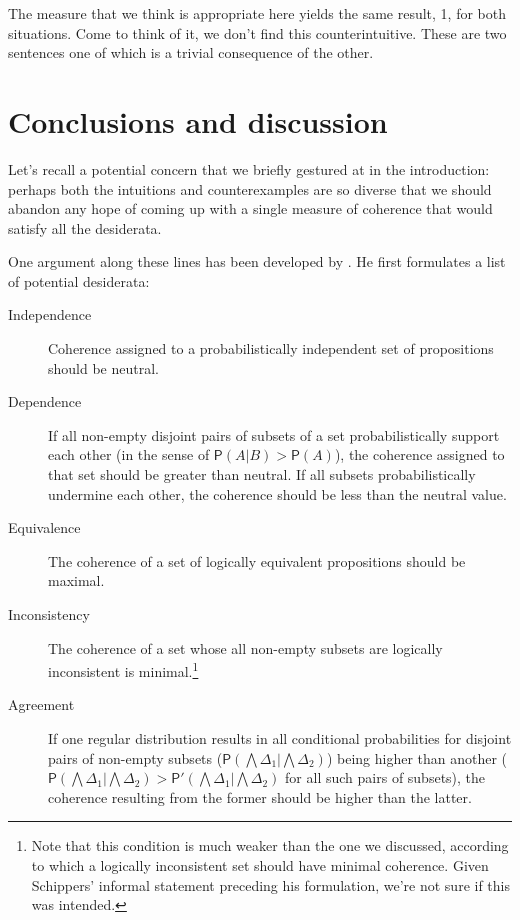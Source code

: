 \documentclass[10pt,]{scrartcl}
\newcommand{\pr}{\mathsf{P}}
\begin{document}
The measure that we think is appropriate here yields the same result, 1,
for both situations. Come to think of it, we don't find this
counterintuitive. These are two sentences one of which is a trivial
consequence of the other.

\section{Conclusions and discussion}\label{conclusions-and-discussion}

Let's recall a potential concern that we briefly gestured at in the
introduction: perhaps both the intuitions and counterexamples are so
diverse that we should abandon any hope of coming up with a single
measure of coherence that would satisfy all the desiderata.

One argument along these lines has been developed by
. He first formulates a list of potential
desiderata:

\vspace{2mm}

\begin{description}
\item[Independence] Coherence assigned to a probabilistically independent set of propositions should be neutral.
\item[Dependence] If all non-empty disjoint pairs of subsets of a set probabilistically support each other (in the sense of $\pr(A\vert B)> \pr(A)$), the coherence assigned to that set should be greater than neutral. If all subsets probabilistically undermine each other, the coherence should be less than the neutral value.
\item[Equivalence] The coherence of a set of logically  equivalent propositions should be maximal.

\item[Inconsistency] The coherence of a set whose all non-empty subsets are logically inconsistent is minimal.\footnote{Note that this condition is much weaker than the one we discussed, according to which a logically inconsistent set should have minimal coherence. Given Schippers' informal statement preceding his formulation, we're not sure if this was intended.}

\item[Agreement] If one regular distribution results in all conditional probabilities for disjoint pairs of non-empty subsets ($\pr(\bigwedge \Delta_1 \vert \bigwedge  \Delta_2)$) being higher than another  ($\pr(\bigwedge \Delta_1 \vert \bigwedge  \Delta_2) > \pr'(\bigwedge \Delta_1 \vert \bigwedge  \Delta_2)$ for all such pairs of subsets), the coherence resulting from the former should be higher than the latter.  
\end{description}
\end{document}

